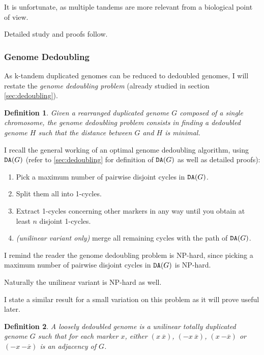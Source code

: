 \documentclass[11pt,final,twoside,nofrench]{thlifl}
\newcommand{\fst}[1]{ \ensuremath{#1} }
\newcommand{\snd}[1]{ \ensuremath{\overline{#1}} }
\newcommand{\msnd}[1]{ \ensuremath{{-\overline{#1}}} }
\newcommand\aff[2]{\ensuremath{(\fst{#1}~\fst{#2})}}
\newcommand\afs[2]{\ensuremath{(\fst{#1}~\snd{#2})}}
\newcommand{\DA}{\ensuremath{\mbox{\texttt{DA}}}}
\newtheorem{definition}{Definition}
\begin{document}
It is unfortunate, as multiple tandems are more relevant from a biological point of view.

Detailed study and proofs follow.

\subsubsection{Genome Dedoubling}

As k-tandem duplicated genomes can be reduced to dedoubled
genomes, I will restate the \emph{genome dedoubling problem} (already studied in section \ref{sec:dedoubling}).

\begin{definition}
Given a rearranged duplicated genome $G$ composed of a single chromosome, the
\emph{genome dedoubling problem} consists in finding a dedoubled genome $H$ such
that the distance between $G$ and $H$ is minimal.
\end{definition}

I recall the general working of an optimal genome dedoubling algorithm, using $\DA(G)$ (refer to \ref{sec:dedoubling} for definition of $\DA(G)$ as well as detailed proofs):

\begin{enumerate}
\item{Pick a maximum number of pairwise disjoint cycles in $\DA(G)$.}

\item{Split them all into 1-cycles.}

\item{Extract 1-cycles concerning other markers in any way until you obtain at least $n$ disjoint 1-cycles.}

\item{\textit{(unilinear variant only)} merge all remaining cycles with the path of $\DA(G)$.}

\end{enumerate}

I remind the reader the genome dedoubling problem is NP-hard, since picking a maximum number of pairwise disjoint cycles in $\DA(G)$ is NP-hard. 

Naturally the unilinear variant is NP-hard as well.

I state a similar result for a small variation on this problem as it will prove useful later.

\begin{definition}
A \emph{loosely dedoubled genome} is a unilinear totally duplicated genome $G$ such that for each marker $x$, either \afs{x}{x}, \afs{-x}{x}, \aff{x}{\msnd{x}} or \aff{-x}{\msnd{x}} is an adjacency of $G$.
\end{definition}
\end{document}
